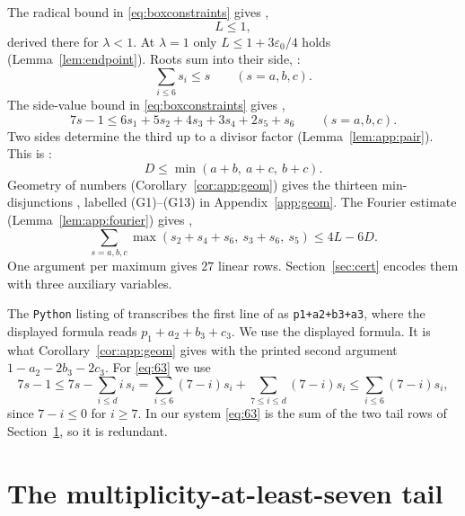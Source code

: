 \documentclass{amsart}
\theoremstyle{definition}
\theoremstyle{plain}
\numberwithin{equation}{section}
\numberwithin{table}{section}
\begin{document}
The radical bound in \eqref{eq:boxconstraints} gives \cite[(6.1)]{BBLT},
\begin{equation}\label{eq:L}
 L\le1,
\end{equation}
derived there for $\lambda<1$. At $\lambda=1$ only $L\le1+3\varepsilon_0/4$
holds (Lemma~\ref{lem:endpoint}). Roots sum into their side,
\cite[(6.2)]{BBLT}:
\begin{equation}\label{eq:root}
 \sum_{i\le6}s_i\le s\qquad(s=a,b,c).
\end{equation}
The side-value bound in \eqref{eq:boxconstraints} gives \cite[(6.3)]{BBLT},
\begin{equation}\label{eq:63}
 7s-1\le6s_1+5s_2+4s_3+3s_4+2s_5+s_6\qquad(s=a,b,c).
\end{equation}
Two sides determine the third up to a divisor factor
(Lemma~\ref{lem:app:pair}). This is \cite[(6.4)]{BBLT}:
\begin{equation}\label{eq:pair}
 D\le\min(a+b,\ a+c,\ b+c).
\end{equation}
Geometry of numbers (Corollary~\ref{cor:app:geom}) gives the thirteen
min-disjunctions \cite[(6.5)--(6.9)]{BBLT}, labelled (G1)--(G13) in
Appendix~\ref{app:geom}. The Fourier estimate (Lemma~\ref{lem:app:fourier})
gives \cite[(6.10)]{BBLT},
\begin{equation}\label{eq:fourier}
 \sum_{s=a,b,c}\max(s_2+s_4+s_6,\ s_3+s_6,\ s_5)\le4L-6D .
\end{equation}
One argument per maximum gives $27$ linear rows. Section~\ref{sec:cert}
encodes them with three auxiliary variables.

The \texttt{Python} listing of \cite[Appendix~A]{BBLT} transcribes the first
line of \cite[(6.9)]{BBLT} as \texttt{p1+a2+b3+a3}, where the displayed formula
reads $p_1+a_2+b_3+c_3$. We use the displayed formula. It is what
Corollary~\ref{cor:app:geom} gives with the printed second argument
$1-a_2-2b_3-2c_3$. For \eqref{eq:63} we use
\begin{equation}\label{eq:63proof}
 7s-1\le7s-\sum_{i\le d}i\,s_i
 =\sum_{i\le6}(7-i)s_i+\sum_{7\le i\le d}(7-i)s_i
 \le\sum_{i\le6}(7-i)s_i,
\end{equation}
since $7-i\le0$ for $i\ge7$. In our system \eqref{eq:63} is the sum of the two
tail rows of Section~\ref{sec:tail}, so it is redundant.

\section{The multiplicity-at-least-seven tail}\label{sec:tail}
\end{document}
